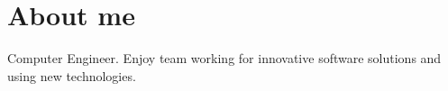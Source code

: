 \documentclass[11pt,a4paper,sans]{moderncv}   %
\begin{document}
\maketitle

\section{About me}
\cvitem
    {}
    {Computer Engineer. Enjoy team working for innovative software solutions and using new technologies.}{}





\nocite{*}
%
\end{document}
